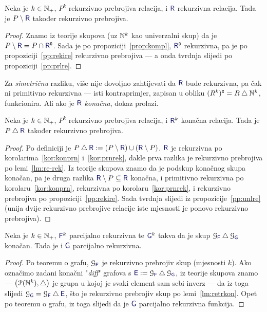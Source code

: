 \begin{lema}[{name=[rekurzivna prebrojivost razlike s rekurzivnom relacijom]}]\label{lm:re-rek}
Neka je $k\in{\mathbb N}_+$, $P^k$ rekurzivno prebrojiva relacija, i $\f R$ rekurzivna relacija. Tada je $P\setminus\f R$ također rekurzivno prebrojiva.
\end{lema}
\begin{proof}
Znamo iz teorije skupova (uz ${\mathbb N}^k$ kao univerzalni skup) da je $P\setminus\f R=P\cap\f R\kompl$. Sada je po propoziciji~\ref{prop:kompl}, $\f R\kompl$ rekurzivna, pa je po propoziciji~\ref{pp:rekire} rekurzivno prebrojiva --- a onda tvrdnja slijedi po propoziciji~\ref{pp:prlre}.
\end{proof}

Za \emph{simetričnu} razliku, više nije dovoljno zahtijevati da $\f R$ bude rekurzivna, pa čak ni primitivno rekurzivna --- isti kontraprimjer, zapisan u obliku $(R^k)\sp{{\scriptscriptstyle\complement}}=R\mathbin\triangle{\mathbb N}^k$, funkcionira. Ali ako je $\f R$ \emph{konačna}, dokaz prolazi.

\begin{lema}[{name=[rekurzivna prebrojivost simetrične razlike s konačnom relacijom]}]\label{lm:retrkon}
Neka je $k\in{\mathbb N}_+$, $P^k$ rekurzivno prebrojiva relacija, i $\f R^k$ konačna relacija. Tada je $P\mathbin\triangle\f R$ također rekurzivno prebrojiva.
\end{lema}
\begin{proof}
Po definiciji je $P\mathbin\triangle\f R:=(P\setminus\f R)\cup(\f R\setminus P)$. 
$\f R$ je rekurzivna po korolarima~\ref{kor:konprn} i~\ref{kor:prnrek}, dakle prva razlika je rekurzivno prebrojiva po lemi~\ref{lm:re-rek}. Iz teorije skupova znamo da je podskup konačnog skupa konačan, pa je druga razlika $\f R\setminus P\subseteq\f R$ konačna, i primitivno rekurzivna po korolaru~\ref{kor:konprn}, rekurzivna po korolaru~\ref{kor:prnrek}, i rekurzivno prebrojiva po propoziciji~\ref{pp:rekire}. Sada tvrdnja slijedi iz propozicije~\ref{pp:unlre} (unija dvije rekurzivno prebrojive relacije iste mjesnosti je ponovo rekurzivno prebrojiva).
\end{proof}

\begin{propozicija}[{name=[teorem o editiranju za parcijalne funkcije]}]
Neka je $k\in{\mathbb N}_+$, $\f F^k$ parcijalno rekurzivna te $\f G^k$ takva da je skup $\graf{\f F}\mathbin\triangle\graf{\f G}$ konačan. Tada je i $\f G$ parcijalno rekurzivna.
\end{propozicija}
\begin{proof}
Po teoremu o grafu, $\graf{\f F}$ je rekurzivno prebrojiv skup (mjesnosti $k$). Ako označimo zadani konačni "\emph{\!diff}" grafova s $\f E:=\graf{\f F}\mathbin\triangle\graf{\f G}$, iz teorije skupova znamo --- $\bigl(\mathcal P({\mathbb N}^k),\mathbin\triangle\bigr)$ je grupa u kojoj je svaki element sam sebi inverz --- da iz toga slijedi $\graf{\f G}=\graf{\f F}\mathbin\triangle\f E$, što je rekurzivno prebrojiv skup po lemi~\ref{lm:retrkon}. Opet po teoremu o grafu, iz toga slijedi da je $\f G$ parcijalno rekurzivna funkcija.
\end{proof}

